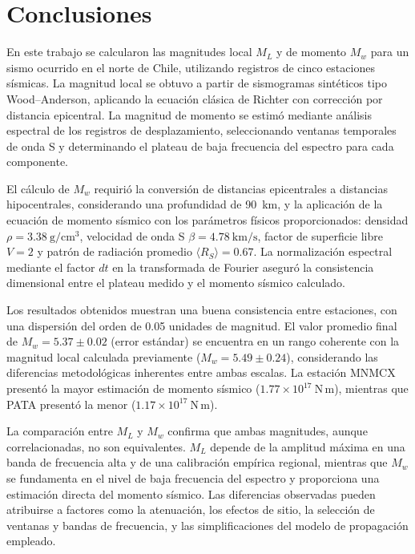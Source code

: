 \documentclass[a4paper,12pt]{article} %
\numberwithin{equation}{section} %
\numberwithin{figure}{section} %
\begin{document}
\section{Conclusiones}

En este trabajo se calcularon las magnitudes local $M_L$ y de momento $M_w$ para un sismo ocurrido en el norte de Chile, utilizando registros de cinco estaciones sísmicas. La magnitud local se obtuvo a partir de sismogramas sintéticos tipo Wood--Anderson, aplicando la ecuación clásica de Richter con corrección por distancia epicentral. La magnitud de momento se estimó mediante análisis espectral de los registros de desplazamiento, seleccionando ventanas temporales de onda S y determinando el plateau de baja frecuencia del espectro para cada componente.

El cálculo de $M_w$ requirió la conversión de distancias epicentrales a distancias hipocentrales, considerando una profundidad de 90~km, y la aplicación de la ecuación de momento sísmico con los parámetros físicos proporcionados: densidad $\rho=3.38~\mathrm{g/cm^3}$, velocidad de onda S $\beta=4.78~\mathrm{km/s}$, factor de superficie libre $V=2$ y patrón de radiación promedio $\langle R_S\rangle=0.67$. La normalización espectral mediante el factor $dt$ en la transformada de Fourier aseguró la consistencia dimensional entre el plateau medido y el momento sísmico calculado.

Los resultados obtenidos muestran una buena consistencia entre estaciones, con una dispersión del orden de 0.05 unidades de magnitud. El valor promedio final de $M_w=5.37\pm0.02$ (error estándar) se encuentra en un rango coherente con la magnitud local calculada previamente ($M_w = 5.49 \pm 0.24$), considerando las diferencias metodológicas inherentes entre ambas escalas. La estación MNMCX presentó la mayor estimación de momento sísmico ($1.77\times10^{17}~\mathrm{N\,m}$), mientras que PATA presentó la menor ($1.17\times10^{17}~\mathrm{N\,m}$).

La comparación entre $M_L$ y $M_w$ confirma que ambas magnitudes, aunque correlacionadas, no son equivalentes. $M_L$ depende de la amplitud máxima en una banda de frecuencia alta y de una calibración empírica regional, mientras que $M_w$ se fundamenta en el nivel de baja frecuencia del espectro y proporciona una estimación directa del momento sísmico. Las diferencias observadas pueden atribuirse a factores como la atenuación, los efectos de sitio, la selección de ventanas y bandas de frecuencia, y las simplificaciones del modelo de propagación empleado.
\end{document}
